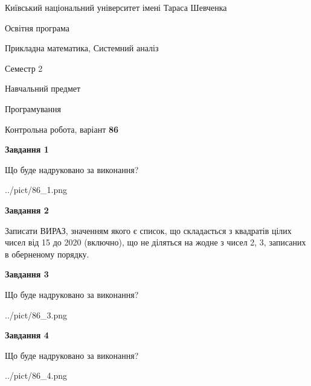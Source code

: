 \documentclass[12pt, ukrainian]{article}
\begin{document}
{{\begin {small}\par
{ \center  Київський національний університет імені Тараса Шевченка \par}
{\parbox {5 cm}{Освітня програма \hfill}{\parbox {8 cm}{Прикладна математика, Системний аналіз \hfill}}\parbox {5 cm}{\hfill Семестр 2}}\par
{\parbox {5 cm} {Навчальний предмет \hfill}\parbox {7 cm}{Програмування \hfill}\parbox {6cm}{\hfill}\par}\vspace{-7pt} \end{small}}{\center Контрольна робота, варіант  \No \textbf
{ 86 }\par}}
{
\begin {large}
{\begin {center}\textbf{Завдання 1}\end {center}}\par
Що буде надруковано за виконання?\par\par
\begin{center}
	{../pict/86_1.png}
\end{center}
\newpage

{\begin {center}\textbf{Завдання 2}\end {center}}\par

Записати ВИРАЗ, значенням якого є список, що складається з квадратів цілих чисел від 15 до 2020 (включно), що не діляться на жодне з чисел 2, 3, записаних в обернено\-му порядку.\par
\newpage

{\begin {center}\textbf{Завдання 3}\end {center}}\par
Що буде надруковано за виконання?
\begin{center}
	{../pict/86_3.png}
\end{center}
\newpage

{\begin {center}\textbf{Завдання 4}\end {center}}\par
Що буде надруковано за виконання?\par
\begin{center}
	{../pict/86_4.png}
\end{center}
\newpage


\end{large}}
\end{document}
